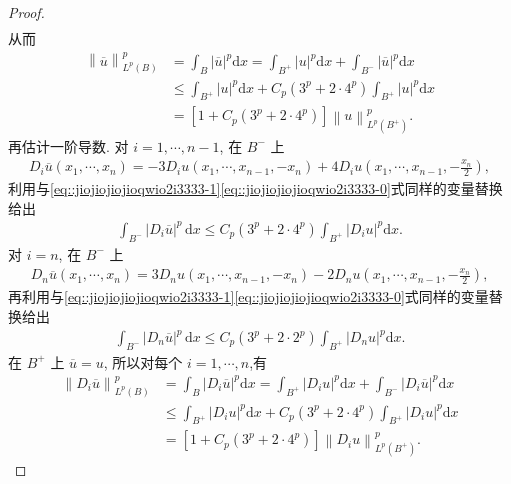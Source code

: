 \documentclass[../../main.tex]{subfiles}%
\begin{document}
\begin{proof}
\begin{align*}
\end{align*}
从而
\begin{align}
\left\| \overline{u} \right\| _{L^p\left( B \right)}^{p}&=\int_B{\left| \overline{u} \right|^p\mathrm{d}x}=\int_{B^+}{\left| u \right|^p\mathrm{d}x}+\int_{B^-}{\left| \overline{u} \right|^p\mathrm{d}x}
\nonumber \\
&\leqslant \int_{B^+}{\left| u \right|^p\mathrm{d}x}+C_p\left( 3^p+2\cdot 4^p \right) \int_{B^+}{\left| u \right|^p\mathrm{d}x}
\nonumber \\
&=\left[ 1+C_p\left( 3^p+2\cdot 4^p \right) \right] \left\| u \right\| _{L^p\left( B^+ \right)}^{p}.\label{eq:::HJiuhj3u892HFFHJIOEJO}
\end{align}
再估计一阶导数. 对 \(i=1,\cdots,n-1\), 在 \(B^-\) 上
\begin{align*}
D_i\overline{u}(x_1,\cdots,x_n)
=-3D_i u(x_1,\cdots,x_{n-1},-x_n)
+4D_i u\left(x_1,\cdots,x_{n-1},-\frac{x_n}{2}\right),
\end{align*}
利用与\eqref{eq::jiojiojiojioqwio2i3333-1}\eqref{eq::jiojiojiojioqwio2i3333-0}式同样的变量替换给出
\begin{align*}
\int_{B^-}|D_i\overline{u}|^p\,\mathrm{d}x
\leqslant C_p(3^p+2\cdot 4^p)\int_{B^+}{\left| D_iu \right|^p\mathrm{d}x}.
\end{align*}
对 \(i=n\), 在 \(B^-\) 上
\begin{align*}
D_n\overline{u}(x_1,\cdots,x_n)
=3D_n u(x_1,\cdots,x_{n-1},-x_n)
-2D_n u\left(x_1,\cdots,x_{n-1},-\frac{x_n}{2}\right),
\end{align*}
再利用与\eqref{eq::jiojiojiojioqwio2i3333-1}\eqref{eq::jiojiojiojioqwio2i3333-0}式同样的变量替换给出
\begin{align*}
\int_{B^-}|D_n\overline{u}|^p\,\mathrm{d}x
\leqslant C_p(3^p+2\cdot 2^p)\int_{B^+}{\left| D_nu \right|^p\mathrm{d}x}.
\end{align*}
在 \(B^+\) 上 \(\overline{u}=u\), 所以对每个 \(i=1,\cdots,n\),有
\begin{align}
\left\| D_i\overline{u} \right\| _{L^p\left( B \right)}^{p}&=\int_B{\left| D_i\overline{u} \right|^p\mathrm{d}x}=\int_{B^+}{\left| D_iu \right|^p\mathrm{d}x}+\int_{B^-}{\left| D_i\overline{u} \right|^p\mathrm{d}x}
\nonumber \\
&\leqslant \int_{B^+}{\left| D_iu \right|^p\mathrm{d}x}+C_p\left( 3^p+2\cdot 4^p \right) \int_{B^+}{\left| D_iu \right|^p\mathrm{d}x}
\nonumber \\
&=\left[ 1+C_p\left( 3^p+2\cdot 4^p \right) \right] \left\| D_iu \right\| _{L^p\left( B^+ \right)}^{p}.\label{eq:::HJiuhj3u892HFFHJIOEJO-1}

\end{align}
\end{proof}
\end{document}

